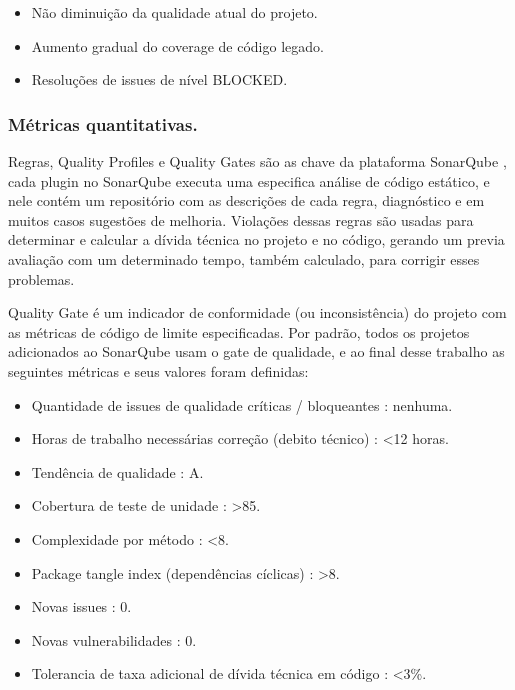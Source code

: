 \documentclass[12pt]{article}
\begin{document}
 \begin{itemize}
 	\item Não diminuição da qualidade atual do projeto.
 	\item Aumento gradual do coverage de código legado.
 	\item Resoluções de issues de nível BLOCKED.
 \end{itemize}

\subsubsection{Métricas quantitativas.} \label{sec:sonar-planning-mquantity}

Regras, Quality Profiles e Quality Gates são as chave da plataforma SonarQube \cite{SONARQUBE}, cada plugin no SonarQube executa uma especifica análise de código estático, e nele contém um repositório com as descrições de cada regra, diagnóstico e em muitos casos sugestões de melhoria.
Violações dessas regras são usadas para determinar e calcular a dívida técnica no projeto e no código, gerando um previa avaliação com um determinado tempo, também calculado, para corrigir esses problemas.

Quality Gate é um indicador de conformidade (ou inconsistência) do projeto com as métricas de código de limite especificadas\cite{SONARQUBE}. Por padrão, todos os projetos adicionados ao SonarQube usam o gate de qualidade, e ao final desse trabalho as seguintes métricas e seus valores foram definidas:

 \begin{itemize}
 	\item Quantidade de issues de qualidade críticas / bloqueantes : nenhuma.
 	\item Horas de trabalho necessárias correção (debito técnico) : \textless 12 horas.
 	\item Tendência de qualidade : A.
 	\item Cobertura de teste de unidade : \textgreater 85.
 	\item Complexidade por método : \textless 8.
 	\item Package tangle index (dependências cíclicas) : \textgreater 8.
	\item Novas issues : 0.
	\item Novas vulnerabilidades : 0.
	\item Tolerancia de taxa adicional de dívida técnica em código : \textless 3\%.
 \end{itemize}
\end{document}
